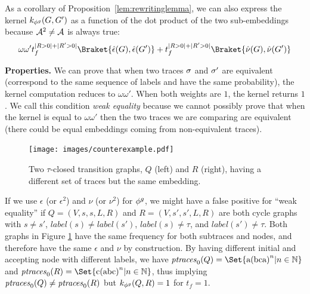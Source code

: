 
{As a corollary of Proposition~\ref{lem:rewritinglemma}, we can also express the kernel $k_{\gorgembed}(G,G')$ as a function of the dot product of the two sub-embeddings because $\tasks^2\neq\tasks$ is always true:}
\begin{equation}\label{eq:corollLem1}
{\omega\omega't_f^{|R>0|+|R'>0|}\Braket{\hat{\epsilon}(G), \hat{\epsilon}(G')}+ t_f^{|R>0|+|R'>0|}\Braket{\hat{\nu}(G), \hat{\nu}(G')}}
\end{equation}

\noindent
\textbf{Properties.}\label{subsub:prop}
We can prove that when two traces $\logtrace$ and ${\nonlogtrace}$ are equivalent (correspond to the same sequence of labels and have the same probability), the kernel computation reduces to $\omega\omega'$. When both weights are $1$, the kernel returns $1$. We call this condition \textit{weak equality} because we cannot possibly prove that when the kernel is equal to $\omega\omega'$ then the two traces we are comparing are equivalent (there could be equal embeddings coming from non-equivalent traces). 

\begin{figure}[!t]
	\vspace*{-0.5cm}
	\centering
	\texttt{[image: images/counterexample.pdf]}
	\caption{Two $\tau$-closed transition graphs, $Q$ (left) and $R$ (right), having a different set of traces but the same embedding.}\label{fig:counterexample}
\end{figure}
\begin{example}
	If we use $\epsilon$ (or $\epsilon^2$) and $\nu$ (or $\nu^2$) for $\gorgembed$, we might have a false positive for ``weak equality'' if $Q=(V,s,s,L,R)$ and $R=(V,s',s',L,R)$ are both cycle graphs with $s\neq s'$, $\textit{label}(s)\neq\textit{label}(s')$, $\textit{label}(s)\neq\tau$, and $\textit{label}(s')\neq\tau$. Both graphs in Figure \ref{fig:counterexample} have the same frequency for both subtraces and nodes, and therefore have the same  $\epsilon$ and $\nu$ by construction. By having different initial and accepting node with  different labels, we have $\ptraces{Q}{0}=\Set{\textup{a(bca)}^n|n\in\mathbb{N}}$ and $\ptraces{R}{0}=\Set{\textup{c(abc)}^n|n\in\mathbb{N}}$, thus implying $\ptraces{Q}{0}\neq\ptraces{R}{0}$ but $k_{\gorgembed}(Q,R)=1$ for $t_f=1$.
\end{example}


